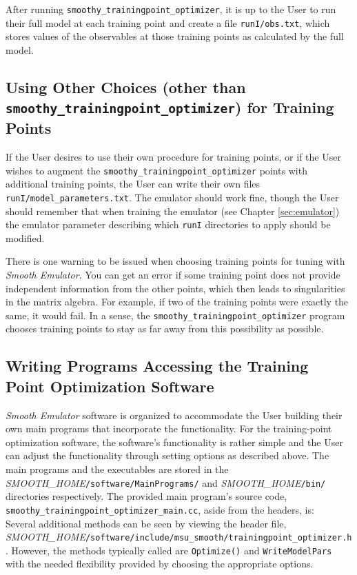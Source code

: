 \documentclass[UserManual.tex]{subfiles}
\begin{document}
\begin{sloppypar}
After running {\tt smoothy\_trainingpoint\_optimizer}, it is up to the User to run their full model at each training point and create a file {\tt runI/obs.txt}, which stores values of the observables at those training points as calculated by the full model. 

\subsection{Using Other Choices (other than {\tt smoothy\_trainingpoint\_optimizer}) for Training Points}

If the User desires to use their own procedure for training points, or if the User wishes to augment the {\tt smoothy\_trainingpoint\_optimizer} points with additional training points, the User can write their own files {\tt runI/model\_parameters.txt}. The emulator should work fine, though the User should remember that when training the emulator (see Chapter \ref{sec:emulator}) the emulator parameter describing which {\tt runI} directories to apply should be modified.

There is one warning to be issued when choosing training points for tuning with {\it Smooth Emulator}. You can get an error if some training point does not provide independent information from the other points, which then leads to singularities in the matrix algebra.  For example, if two of the training points were exactly the same, it would fail. In a sense, the {\tt smoothy\_trainingpoint\_optimizer} program chooses training points to stay as far away from this possibility as possible.

\subsection{Writing Programs Accessing the Training Point Optimization Software}
{\it Smooth Emulator} software is organized to accommodate the User building their own main programs that incorporate the functionality. For the training-point optimization software, the software's functionality is rather simple and the User can adjust the functionality through setting options as described above. The main programs and the executables are stored in the \textit{SMOOTH\_HOME}{\tt /software/MainPrograms/} and \textit{SMOOTH\_HOME}{\tt /bin/} directories respectively. The provided main program's source code, {\tt smoothy\_trainingpoint\_optimizer\_main.cc}, aside from the headers, is:
{\tt{}\vspace*{-8pt}
}
Several additional methods can be seen by viewing the header file, \textit{SMOOTH\_HOME}{\tt /software/include/msu\_smooth/trainingpoint\_optimizer.h}. However, the methods typically called are {\tt Optimize()} and {\tt WriteModelPars} with the needed flexibility provided by choosing the appropriate options.


\end{sloppypar}
\end{document}
